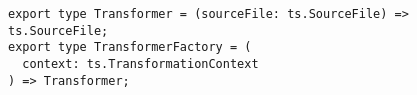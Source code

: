 \begin{verbatim}
export type Transformer = (sourceFile: ts.SourceFile) => ts.SourceFile;
export type TransformerFactory = (
  context: ts.TransformationContext
) => Transformer;
\end{verbatim}
